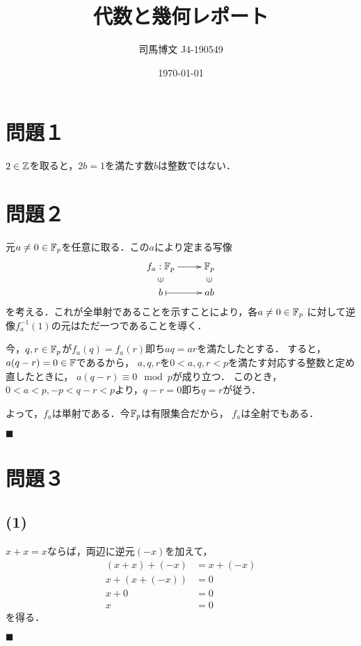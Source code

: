 \documentclass[uplatex, 12pt, dvipdfmx]{jsarticle}
\title{代数と幾何レポート}
\author{司馬博文 J4-190549}
\date{\today}
\begin{document}
\maketitle

\section*{問題１}

$2\in\mathbb{Z}$を取ると，$2b=1$を満たす数$b$は整数ではない．

\section*{問題２}

元$a\ne 0\in\mathbb{F}_p$を任意に取る．この$a$により定まる写像
\[\xymatrix@R-2pc{
    f_a:\F_p\ar[r]&\F_p\\
    \rotatebox{90}{$\in$}&\rotatebox{90}{$\in$}\\
    b\ar@{|->}[r]&ab
}\]
を考える．これが全単射であることを示すことにより，各$a\ne 0\in\mathbb{F}_p$
に対して逆像$f_a^{-1}(1)$の元はただ一つであることを導く．

今，$q,r\in\mathbb{F}_p$が$f_a(q)=f_a(r)$即ち$aq=ar$を満たしたとする．
すると，$a(q-r)=0\in\mathbb{F}$であるから，
$a,q,r$を$0<a,q,r<p$を満たす対応する整数と定め直したときに，
$a(q-r)\equiv 0\mod p$が成り立つ．
このとき，$0<a<p,-p<q-r<p$より，$q-r=0$即ち$q=r$が従う．

よって，$f_a$は単射である．今$\mathbb{F}_p$は有限集合だから，
$f_a$は全射でもある．

\begin{flushright}$\blacksquare$\end{flushright}

\section*{問題３}

\subsection*{(1)}

$x+x=x$ならば，両辺に逆元$(-x)$を加えて，
\begin{align*}
    (x+x) + (-x) &= x + (-x)\\
    x+(x+(-x)) &= 0 \\
    x+0&=0\\
    x&=0
\end{align*}
を得る．
\begin{flushright}$\blacksquare$\end{flushright}
\end{document}
